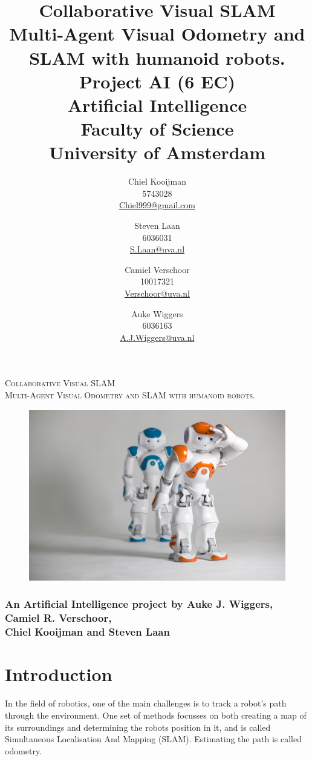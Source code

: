 \documentclass[a4paper]{article}
\author{Chiel Kooijman\\5743028\\\url{Chiel999@gmail.com} \and
Steven Laan\\6036031\\\url{S.Laan@uva.nl} \and
Camiel Verschoor\\10017321\\\url{Verschoor@uva.nl} \and
Auke Wiggers\\6036163\\\url{A.J.Wiggers@uva.nl}}
\title{Collaborative Visual SLAM\\
\normalsize Multi-Agent Visual Odometry and SLAM with humanoid robots.\\Project
AI (6 EC)\\Artificial Intelligence\\Faculty of Science\\
University of Amsterdam}
\begin{document}
\thispagestyle{empty}
\begin{center}
\Large\textsc{Collaborative Visual SLAM}\\
\normalsize\textsc{Multi-Agent Visual Odometry and SLAM with humanoid robots.}

\vspace{2cm}

\begin{figure}[!ht]
\centering
\includegraphics[width=\textwidth]{images/front.jpg}
\end{figure}

\subsubsection*{An Artificial Intelligence project by Auke J. Wiggers, Camiel
R. Verschoor,\\Chiel Kooijman and Steven Laan}
\end{center}

\newpage

\maketitle
\clearpage

\thispagestyle{empty}
\tableofcontents
\clearpage

\section{Introduction}
In the field of robotics, one of the main challenges is to track a robot's path
through the environment. One set of methods focusses on both creating a map of
its surroundings and determining the robots position in it, and is called
Simultaneous Localisation And Mapping (SLAM). Estimating the path is called
odometry.
\end{document}
